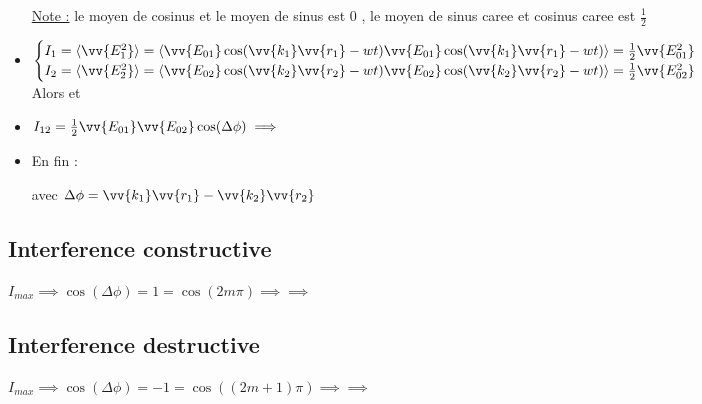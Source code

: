 \documentclass[12pt]{book}
\begin{document}
\begin{itemize}
                    \underline{Note :} le moyen de cosinus et le moyen de sinus est $0$ , le moyen de sinus caree et cosinus caree est $\frac{1}{2}$
                \item $\begin{cases}
                    I_1 = \langle \vv{E_1^2 }\rangle = \langle \vv{E_{01}}\cos(\vv{k_1}\vv{r_1} -wt)\vv{E_{01}}\cos(\vv{k_1}\vv{r_1}-wt) \rangle =\frac{1}{2}\vv{E_{01}^2}\\
                    I_2  = \langle \vv{E_2^2 }\rangle = \langle \vv{E_{02}}\cos(\vv{k_2}\vv{r_2} -wt)\vv{E_{02}}\cos(\vv{k_2}\vv{r_2}-wt) \rangle =\frac{1}{2}\vv{E_{02}^2}
                    \end{cases}$\\
                    Alors  et 
                \item  $I_{12}=\frac{1}{2}\vv{E_{01}}\vv{E_{02}}\cos(\Delta\phi) \implies $
                \item  En fin : \begin{center}
                     avec $\Delta\phi = \vv{k_1}\vv{r_1} - \vv{k_2}\vv{r_2} $
                \end{center}
            \end{itemize}
            \subsection*{Interference constructive}
                $I_{max} \implies \cos(\Delta\phi) = 1 = \cos(2m\pi)\implies$$\implies$\\
            \subsection*{Interference destructive}
                $I_{max} \implies \cos(\Delta\phi) = -1 = \cos((2m+1)\pi)\implies$$\implies$\\
\end{document}
